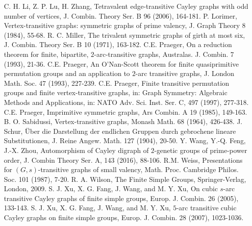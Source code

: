 \documentclass[12pt]{article}
\begin{document}
\begin{thebibliography}{99}
C. H. Li, Z. P. Lu, H. Zhang, Tetravalent edge-transitive Cayley graphs with odd number of vertices,
J. Combin. Theory Ser. B 96 (2006)\textcolor[rgb]{1,0,0}{,} 164-181.
P. Lorimer, Vertex-transitive graphs: symmetric graphs of prime valency,
J. Graph Theory 8 (1984), 55-68.
R. C. Miller, The trivalent symmetric graphs of girth at most six,
J. Combin. Theory Ser. B 10 (1971), 163-182.
 C.E. Praeger, On a reduction theorem for finite, bipartite, $2$-arc-transitive graphs,
Australas. J. Combin. 7 (1993), 21-36.
 C.E. Praeger, An O'Nan-Scott theorem for finite quasiprimitive permutation groups and an application to $2$-arc transitive graphs, J. London Math. Soc. 47 (1993)\textcolor[rgb]{1,0,0}{,} 227-239.
 C.E. Praeger, Finite transitive permutation groups and finite vertex-transitive graphs, in: Graph Symmetry: Algebraic Methods and Applications, in: NATO Adv. Sci. Inst. Ser. C, 497 (1997)\textcolor[rgb]{1,0,0}{,} 277-318.
 C.E. Praeger, Imprimitive symmetric graphs, Ars Combin. A 19 (1985)\textcolor[rgb]{1,0,0}{,} 149-163.
B. O. Sabidussi, Vertex-transitive graphs, Monash Math. 68 (1964), 426-438.
J. Schur, \" Uber die Darstellung der endlichen Gruppen durch gebrochene
lineare Substitutionen, J. Reine Angew. Math. 127 (1904), 20-50.
Y. Wang, Y.-Q. Feng, J.-X. Zhou, Automorphism of Cayley digraph of $2$-genetic groups of prime-power order,
J. Combin Theory Ser. A, 143 (2016), 88-106.
R.M. Weiss, Presentations for $(G,s)$-transitive graphs of small valency,
Math. Proc. Cambridge Philos. Soc. 101 (1987), 7-20.
R. A. Wilson, The Finite Simple Groups, Springer-Verlag, London, 2009.
S. J. Xu, X. G. Fang, J. Wang, and M. Y. Xu, On cubic $s$-arc transitive Cayley graphs of finite simple groups,
Europ. J. Combin. 26 (2005), 133-143.
S. J. Xu, X. G. Fang, J. Wang, and M. Y. Xu, $5$-arc transitive cubic Cayley graphs on finite simple groups,
Europ. J. Combin. 28 (2007), 1023-1036.
\end{thebibliography}
\end{document}
